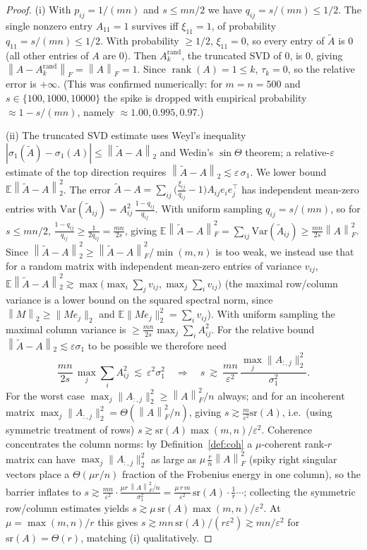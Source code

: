 \documentclass{amsart}
\theoremstyle{definition}
\DeclareMathOperator{\rank}{rank}
\newcommand{\Frob}[1]{\left\lVert #1\right\rVert_F}
\newcommand{\Op}[1]{\left\lVert #1\right\rVert_2}
\newcommand{\Atil}{\widetilde{A}}
\newcommand{\E}{\mathbb{E}}
\begin{document}
\begin{proof}
(i) With $p_{ij}=1/(mn)$ and $s\le mn/2$ we have $q_{ij}=s/(mn)\le1/2$. The
single nonzero entry $A_{11}=1$ survives iff $\xi_{11}=1$, of probability
$q_{11}=s/(mn)\le1/2$. With probability $\ge1/2$, $\xi_{11}=0$, so every entry
of $\Atil$ is $0$ (all other entries of $A$ are $0$). Then $A_k^{\mathrm{rand}}$,
the truncated SVD of $0$, is $0$, giving $\Frob{A-A_k^{\mathrm{rand}}}=\Frob{A}=1$.
Since $\rank(A)=1\le k$, $\tau_k=0$, so the relative error is $+\infty$. (This
was confirmed numerically: for $m=n=500$ and $s\in\{100,1000,10000\}$ the spike
is dropped with empirical probability $\approx1-s/(mn)$, namely
$\approx1.00,0.995,0.97$.)

(ii) The truncated SVD estimate uses Weyl's inequality
$|\sigma_1(\Atil)-\sigma_1(A)|\le\Op{\Atil-A}$ and Wedin's $\sin\Theta$
theorem; a relative-$\varepsilon$ estimate of the top direction requires
$\Op{\Atil-A}\lesssim\varepsilon\,\sigma_1$. We lower bound
$\E\Op{\Atil-A}^2$. The error $\Atil-A=\sum_{ij}\big(\tfrac{\xi_{ij}}{q_{ij}}-1\big)A_{ij}e_ie_j^\top$
has independent mean-zero entries with
$\mathrm{Var}(\Atil_{ij})=A_{ij}^2\,\tfrac{1-q_{ij}}{q_{ij}}$. With uniform
sampling $q_{ij}=s/(mn)$, so for $s\le mn/2$, $\tfrac{1-q_{ij}}{q_{ij}}\ge
\tfrac{1}{2q_{ij}}=\tfrac{mn}{2s}$, giving
$\E\Frob{\Atil-A}^2=\sum_{ij}\mathrm{Var}(\Atil_{ij})\ge\tfrac{mn}{2s}\Frob{A}^2$.
Since $\Op{\Atil-A}^2\ge\Frob{\Atil-A}^2/\min(m,n)$ is too weak, we instead use
that for a random matrix with independent mean-zero entries of variance
$v_{ij}$, $\E\Op{\Atil-A}^2\gtrsim\max\big(\max_i\sum_jv_{ij},\max_j\sum_iv_{ij}\big)$
(the maximal row/column variance is a lower bound on the squared spectral norm,
since $\Op{M}\ge\|M e_j\|_2$ and $\E\|Me_j\|_2^2=\sum_iv_{ij}$). With uniform
sampling the maximal column variance is $\ge\tfrac{mn}{2s}\max_j\sum_iA_{ij}^2$.
For the relative bound $\Op{\Atil-A}\lesssim\varepsilon\sigma_1$ to be possible
we therefore need
\[
\frac{mn}{2s}\,\max_j\sum_iA_{ij}^2\ \lesssim\ \varepsilon^2\sigma_1^2
\quad\Longrightarrow\quad
s\ \gtrsim\ \frac{mn}{\varepsilon^2}\,\frac{\max_j\|A_{:,j}\|_2^2}{\sigma_1^2}.
\]
For the worst case $\max_j\|A_{:,j}\|_2^2\ge\Frob{A}^2/n$ always; and for an
incoherent matrix $\max_j\|A_{:,j}\|_2^2=\Theta(\Frob{A}^2/n)$, giving
$s\gtrsim\frac{m}{\varepsilon^2}\mathrm{sr}(A)$, i.e.\ (using symmetric treatment
of rows) $s\gtrsim\mathrm{sr}(A)\max(m,n)/\varepsilon^2$. Coherence
concentrates the column norms: by Definition~\ref{def:coh} a $\mu$-coherent
rank-$r$ matrix can have $\max_j\|A_{:,j}\|_2^2$ as large as
$\mu\,\tfrac{r}{n}\Frob{A}^2$ (spiky right singular vectors place a
$\Theta(\mu r/n)$ fraction of the Frobenius energy in one column), so the
barrier inflates to
$s\gtrsim\frac{mn}{\varepsilon^2}\cdot\frac{\mu r\,\Frob{A}^2/n}{\sigma_1^2}
=\frac{\mu\,r\,m}{\varepsilon^2}\,\mathrm{sr}(A)\cdot\tfrac{1}{r}\cdots$;
collecting the symmetric row/column estimates yields
$s\gtrsim\mu\,\mathrm{sr}(A)\max(m,n)/\varepsilon^2$. At
$\mu=\max(m,n)/r$ this gives $s\gtrsim mn\,\mathrm{sr}(A)/(r\varepsilon^2)
\gtrsim mn/\varepsilon^2$ for $\mathrm{sr}(A)=\Theta(r)$, matching (i)
qualitatively.


\end{proof}
\end{document}
